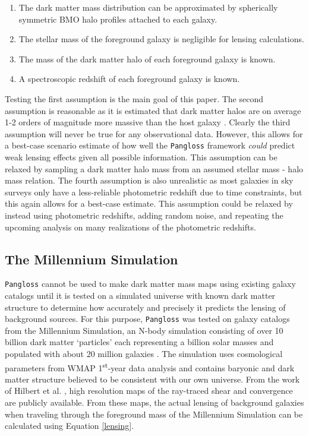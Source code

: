 \documentclass[%
 reprint,
 amsmath,amssymb,
 aps,nofootinbib
]{revtex4-1}
\begin{document}
\begin{enumerate}
\item The dark matter mass distribution can be approximated by spherically symmetric BMO halo profiles attached to each galaxy.
\item The stellar mass of the foreground galaxy is negligible for lensing calculations.
\item The mass of the dark matter halo of each foreground galaxy is known.
\item A spectroscopic redshift of each foreground galaxy is known.
\end{enumerate}

Testing the first assumption is the main goal of this paper. The second assumption is reasonable as it is estimated that dark matter halos are on average 1-2 orders of magnitude more massive than the host galaxy \cite{smhr}. Clearly the third assumption will never be true for any observational data. However, this allows for a best-case scenario estimate of how well the \texttt{Pangloss} framework \textit{could} predict weak lensing effects given all possible information. This assumption can be relaxed by sampling a dark matter halo mass from an assumed stellar mass - halo mass relation. The fourth assumption is also unrealistic as most galaxies in sky surveys only have a less-reliable photometric redshift due to time constraints, but this again allows for a best-case estimate. This assumption could be relaxed by instead using photometric redshifts, adding random noise, and repeating the upcoming analysis on many realizations of the photometric redshifts.

\subsection*{The Millennium Simulation}
\texttt{Pangloss} cannot be used to make dark matter mass maps using existing galaxy catalogs until it is tested on a simulated universe with known dark matter structure to determine how accurately and precisely it predicts the lensing of background sources. For this purpose, \texttt{Pangloss} was tested on galaxy catalogs from the Millennium Simulation, an N-body simulation consisting of over 10 billion dark matter `particles' each representing a billion solar masses and populated with about 20 million galaxies \cite{millennium_simulation}. The simulation uses cosmological parameters from WMAP 1\textsuperscript{st}-year data analysis and contains baryonic and dark matter structure believed to be consistent with our own universe. From the work of Hilbert et al. \cite{ray_tracing}, high resolution maps of the ray-traced shear and convergence are publicly available. From these maps, the actual lensing of background galaxies when traveling through the foreground mass of the Millennium Simulation can be calculated using Equation \eqref{lensing}.
\end{document}
